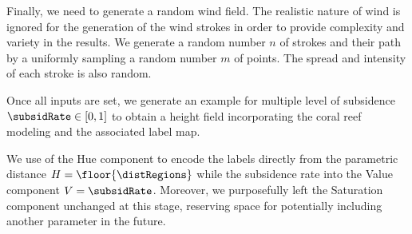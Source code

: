 
Finally, we need to generate a random wind field. The realistic nature of wind is ignored for the generation of the wind strokes in order to provide complexity and variety in the results. 
We generate a random number $n$ of strokes and their path by a uniformly sampling a random number $m$ of points. The spread and intensity of each stroke is also random.

Once all inputs are set, we generate an example for multiple level of subsidence $\subsidRate \in [0, 1]$ to obtain a height field incorporating the coral reef modeling and the associated label map. %


We use of the Hue component to encode the labels directly from the parametric distance $H = \floor{\distRegions}$ while the subsidence rate into the Value component $V =\subsidRate$. %
%
Moreover, we purposefully left the Saturation component unchanged at this stage, reserving space for potentially including another parameter in the future. %

